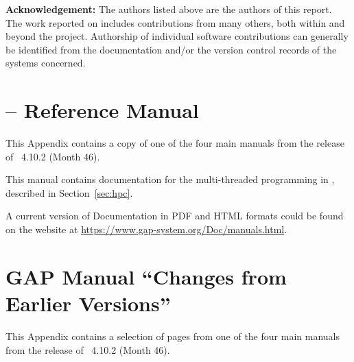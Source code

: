 \documentclass{deliverablereport}
\author{Alexander Konovalov, Stephen Linton and Michael Torpey}
\begin{document}
\maketitle
\githubissuedescription

\vfill

\textbf{Acknowledgement:} The authors listed above are the authors of
this report. The work reported on includes contributions from many
others, both within and beyond the \ODK project. Authorship of
individual software contributions can generally be identified from
the documentation and/or the version control records of the systems concerned.

\vfill
\newpage
\tableofcontents















\clearpage
\appendix

\section{\HPCGAP -- Reference Manual}\label{sec:hpc-manual}

This Appendix contains a copy of 
one of the four main \GAP manuals
from the release of \GAP~4.10.2 (Month 46).

This manual contains documentation for the multi-threaded programming
in \GAP, described in Section~\ref{sec:hpc}.

A current version of \GAP Documentation in PDF and HTML formats
could be found on the \GAP website at \url{https://www.gap-system.org/Doc/manuals.html}.

%

\section{GAP Manual ``Changes from Earlier Versions''}\label{sec:changes-manual}

This Appendix contains a selection of pages from
one of the four main \GAP manuals
from the release of \GAP~4.10.2 (Month 46).
\end{document}
